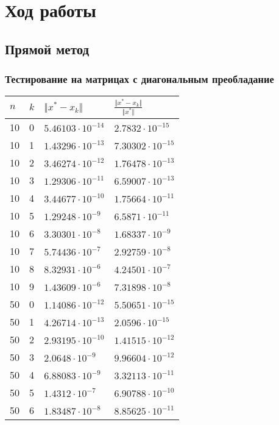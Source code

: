 \documentclass[english]{article}
\begin{document}
\section{Ход работы}
\subsection{Прямой метод}
\subsubsection{Тестирование на матрицах с диагональным преобладание}
\begin{center}
  \begin{longtable}{l|l|l|l}
    \(n\) & \(k\) & \(\Vert x^* - x_k \Vert\) & \(\frac{\Vert x^* - x_k \Vert}{\Vert x^* \Vert}\) \\
    \hline
10 & 0 & \(5.46103\cdot 10^{-14} \)& \(2.7832\cdot 10^{-15}\) \\
10 & 1 & \(1.43296\cdot 10^{-13} \)& \(7.30302\cdot 10^{-15}\) \\
10 & 2 & \(3.46274\cdot 10^{-12} \)& \(1.76478\cdot 10^{-13}\) \\
10 & 3 & \(1.29306\cdot 10^{-11} \)& \(6.59007\cdot 10^{-13}\) \\
10 & 4 & \(3.44677\cdot 10^{-10} \)& \(1.75664\cdot 10^{-11}\) \\
10 & 5 & \(1.29248\cdot 10^{-9} \)& \(6.5871\cdot 10^{-11}\) \\
10 & 6 & \(3.30301\cdot 10^{-8} \)& \(1.68337\cdot 10^{-9}\) \\
10 & 7 & \(5.74436\cdot 10^{-7} \)& \(2.92759\cdot 10^{-8}\) \\
10 & 8 & \(8.32931\cdot 10^{-6} \)& \(4.24501\cdot 10^{-7}\) \\
10 & 9 & \(1.43609\cdot 10^{-6} \)& \(7.31898\cdot 10^{-8}\) \\
\hline
50 & 0 & \(1.14086\cdot 10^{-12} \)& \(5.50651\cdot 10^{-15}\) \\
50 & 1 & \(4.26714\cdot 10^{-13} \)& \(2.0596\cdot 10^{-15}\) \\
50 & 2 & \(2.93195\cdot 10^{-10} \)& \(1.41515\cdot 10^{-12}\) \\
50 & 3 & \(2.0648\cdot 10^{-9}  \)& \(9.96604\cdot 10^{-12}\) \\
50 & 4 & \(6.88083\cdot 10^{-9} \)& \(3.32113\cdot 10^{-11}\) \\
50 & 5 & \(1.4312\cdot 10^{-7}  \)& \(6.90788\cdot 10^{-10}\) \\
50 & 6 & \(1.83487\cdot 10^{-8} \)& \(8.85625\cdot 10^{-11}\) \\

\end{longtable}
\end{center}
\end{document}

